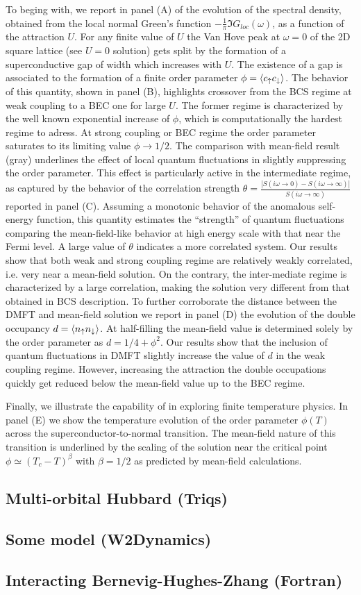 To beging with, we report in  panel (A) of  the
evolution of the spectral density, obtained from the local normal
Green's function $-\tfrac{1}{\pi}\Im{G}_{loc}(\omega)$, as a function
of the attraction $U$. For any finite value of  $U$ the Van Hove peak
at $\omega=0$ of the 2D square lattice (see $U=0$
solution) gets split by the formation of a superconductive gap of
width which increases with $U$.
The existence of a gap is associated to the formation of a finite
order parameter $\phi=\langle c_\uparrow c_\downarrow\rangle$. The behavior of
this quantity, shown in panel (B), highlights crossover from the BCS
regime at weak coupling to a BEC one for large $U$.
The former regime is characterized by the well known exponential increase of
$\phi$, which is computationally the hardest regime to adress. At
strong coupling or BEC regime the order parameter saturates to its
limiting value $\phi\to 1/2$. The comparison with mean-field result
(gray) underlines the effect of local quantum fluctuations in slightly
suppressing the order parameter. This effect is particularly active in
the intermediate regime, as captured by the behavior of the
correlation strength
$\theta=\frac{|S(i\omega\to 0)-S(i\omega\to\infty)|}{S(i\omega\to\infty)}$
reported in panel (C). Assuming a monotonic behavior of the anomalous
self-energy function, this quantity estimates the ``strength'' of
quantum fluctuations comparing the mean-field-like behavior at high
energy scale with that near the Fermi level. A large value of $\theta$
indicates a more correlated system.
Our results show that both weak and strong coupling regime are
relatively weakly correlated, i.e. very near a mean-field solution. On
the contrary, the inter-mediate regime is characterized by a large
correlation, making the solution very different from that obtained in
BCS description.  
To further corroborate the distance between the DMFT and mean-field
solution we report in panel (D) the evolution of the double occupancy
$d=\langle n_\uparrow n_\downarrow\rangle$. At half-filling the mean-field value is
determined solely by the order parameter as $d=1/4 + \phi^2$.
Our results show that the inclusion of quantum fluctuations in DMFT
slightly increase the value of $d$ in the weak coupling
regime. However, increasing the attraction the double occupations
quickly get reduced below the mean-field value up to the BEC regime.

Finally, we illustrate the capability of \NAME in
exploring finite temperature physics. In panel (E) we show the
temperature evolution of the order parameter $\phi(T)$ across the
superconductor-to-normal transition. The mean-field nature of this
transition is underlined by the scaling of  the solution near
the critical point $\phi \simeq (T_c-T)^\beta$ with $\beta=1/2$ as
predicted by mean-field calculations. 





\subsection{Multi-orbital Hubbard (Triqs)}

\subsection{Some model (W2Dynamics)}

\subsection{Interacting Bernevig-Hughes-Zhang (Fortran)}

